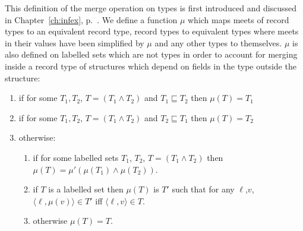 This definition of the merge operation on types is first introduced
and discussed in Chapter~\ref{ch:infex}, p.~\pageref{pg:merge}.
We define a function $\mu$ which maps meets of record types to an
equivalent record type, record types to equivalent types where meets
in their values have been simplified by $\mu$ and any other types to
themselves.  $\mu$ is also defined on labelled sets which are not
types in order to account for merging inside a record type of
structures which depend on fields in the type outside the structure:
\begin{enumerate}
  \item if for some $T_1,T_2$, $T=(T_1\wedge T_2)$ and $T_1\sqsubseteq T_2$
  then $\mu(T)=T_1$ 
 
\item if for some $T_1,T_2$, $T=(T_1\wedge T_2)$ and $T_2\sqsubseteq T_1$
  then $\mu(T)=T_2$
  
\item otherwise:
\begin{enumerate} 
 
\item if for some labelled sets $T_1$, $T_2$, $T=(T_1\wedge T_2)$ then
  $\mu(T)=\mu'(\mu(T_1)\wedge\mu(T_2))$. 
 
\item if $T$ is a labelled set then $\mu(T)$ is $T'$ such that for any
  $\ell$,$v$, $\langle\ell,\mu(v)\rangle\in T'$ iff
  $\langle\ell,v\rangle\in T$.

\item otherwise $\mu(T)=T$.
 
\end{enumerate}
\end{enumerate}

